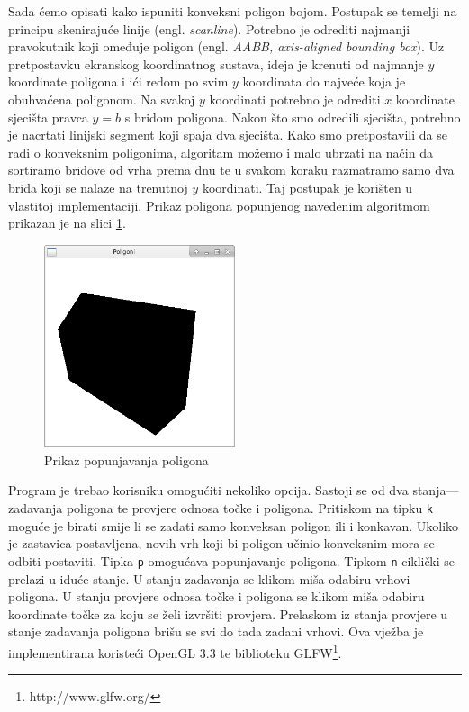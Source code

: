 \documentclass[a4paper,12pt]{article}
\begin{document}
Sada ćemo opisati kako ispuniti konveksni poligon bojom. Postupak se temelji na principu skenirajuće linije
(engl. {\sl scanline}). Potrebno je odrediti najmanji pravokutnik koji omeđuje poligon (engl. {\sl AABB, axis-aligned bounding box}). Uz pretpostavku ekranskog koordinatnog sustava, ideja je krenuti
od najmanje $y$ koordinate poligona i ići redom po svim $y$ koordinata do najveće koja je obuhvaćena poligonom.
Na svakoj $y$ koordinati potrebno je odrediti $x$ koordinate sjecišta pravca $y = b$ s bridom poligona.
Nakon što smo odredili sjecišta, potrebno je nacrtati linijski segment koji spaja dva sjecišta.
Kako smo pretpostavili da se radi o konveksnim poligonima, algoritam možemo i malo ubrzati na način
da sortiramo bridove od vrha prema dnu te u svakom koraku razmatramo samo dva brida koji se nalaze
na trenutnoj $y$ koordinati. Taj postupak je korišten u vlastitoj implementaciji. Prikaz
poligona popunjenog navedenim algoritmom prikazan je na slici \ref{fig:polygon}.

\begin{figure}[H]
  \centering
  \includegraphics[width=0.5\textwidth]{img/polygon.png}
  \caption{Prikaz popunjavanja poligona}
  \label{fig:polygon}
\end{figure}

Program je trebao korisniku omogućiti nekoliko opcija. Sastoji se od dva stanja---zadavanja poligona te provjere odnosa točke i poligona. Pritiskom na tipku {\tt k} moguće je
birati smije li se zadati samo konveksan poligon ili i konkavan. Ukoliko je zastavica postavljena,
novih vrh koji bi poligon učinio konveksnim mora se odbiti postaviti. Tipka {\tt p} omogućava
popunjavanje poligona. Tipkom {\tt n} ciklički se prelazi u iduće stanje. U stanju zadavanja
se klikom miša odabiru vrhovi poligona. U stanju provjere odnosa točke i poligona se klikom miša
odabiru koordinate točke za koju se želi izvršiti provjera. Prelaskom iz stanja provjere u stanje
zadavanja poligona brišu se svi do tada zadani vrhovi. Ova vježba je
implementirana koristeći OpenGL 3.3 te biblioteku GLFW\footnote{http://www.glfw.org/}. 
\end{document}
